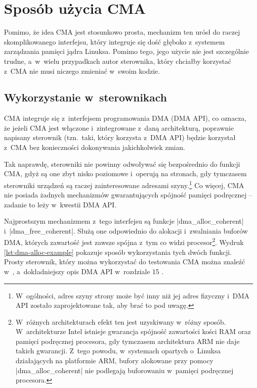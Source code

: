 \chapter{Sposób użycia CMA}\label{sec:cma-usage}

Pomimo, że idea CMA jest stosunkowo prosta, mechanizm ten urósł do
raczej skomplikowanego interfejsu, który integruje się dość głęboko
z~systemem zarządzania pamięci jądra Linuksa.  Pomimo tego, jego
użycie nie jest szczególnie trudne, a~w~wielu przypadkach autor
sterownika, który chciałby korzystać z~CMA nie musi niczego zmieniać
w~swoim kodzie.

\section{Wykorzystanie w~sterownikach}\label{sec:usage-drivers}

CMA integruje się z~interfejsem programowania DMA (DMA API), co
oznacza, że jeżeli CMA jest włączone i~zintegrowane z~daną
architekturą, poprawnie napisany sterownik (tzn.\ taki, który korzysta
z~DMA API) będzie korzystał z~CMA bez konieczności dokonywania
jakichkolwiek zmian.

Tak naprawdę, sterowniki nie powinny odwoływać się bezpośrednio do
funkcji CMA, gdyż są one zbyt nisko poziomowe i~operują na stronach,
gdy tymczasem sterowniki urządzeń są raczej zainteresowane adresami
szyny.\footnote{W~ogólności, adres szyny strony może być inny niż jej
  adres fizyczny i~DMA API zostało zaprojektowane tak, aby brać to pod
  uwagę.}  Co więcej, CMA nie posiada żadnych mechanizmów
gwarantujących spójność pamięci podręcznej -- zadanie to leży
w~kwestii DMA API.

Najprostszym mechanizmem z~tego interfejsu są funkcje
\code|dma_alloc_coherent| i~\code|dma_free_coherent|.  Służą one
odpowiednio do alokacji i~zwalniania buforów DMA, których zawartość
jest zawsze spójna z~tym co widzi procesor\footnote{W~różnych
  architekturach efekt ten jest uzyskiwany w~różny sposób.
  W~architekturze Intel istnieje gwarancja spójność zawartości kości
  RAM oraz pamięci podręcznej procesora, gdy tymczasem architektura
  ARM nie daje takich gwarancji.  Z~tego powodu, w~systemach opartych
  o~Linuksa działających na platformie ARM, bufory alokowane przy
  pomocy \code|dma_alloc_coherent| nie podlegają buforowaniu w~pamięci
  podręcznej procesora.}.  Wydruk \ref{lst:dma-alloc-example} pokazuje
sposób wykorzystania tych dwóch funkcji.  Prosty sterownik, który
można wykorzystać do testowania CMA można znaleźć
w~\cite{patch:cma-test}, a~dokładniejszy opis DMA API w~rozdziale 15
\cite{bib:ldd3}.

